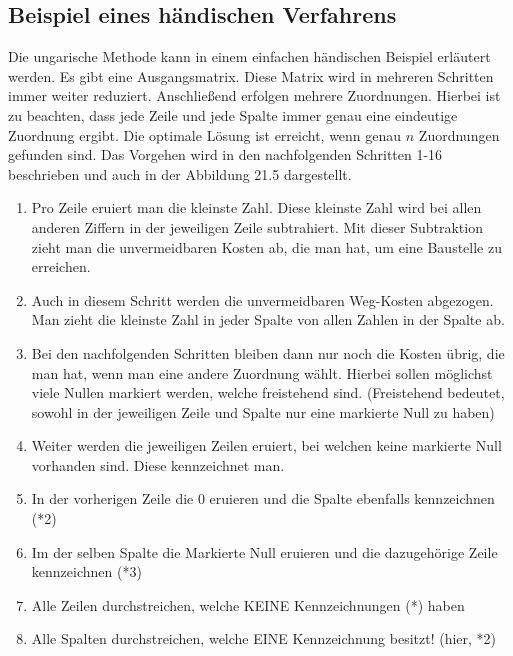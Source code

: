 \subsection{Beispiel eines händischen Verfahrens
\label{munkres:subsection:malorum}}

Die ungarische Methode kann in einem einfachen händischen Beispiel erläutert werden. Es gibt eine Ausgangsmatrix. Diese Matrix wird in mehreren Schritten immer weiter reduziert. Anschließend erfolgen mehrere Zuordnungen. Hierbei ist zu beachten, dass jede Zeile und jede Spalte immer genau eine eindeutige Zuordnung ergibt. Die optimale Lösung ist erreicht, wenn genau $n$ Zuordnungen gefunden sind. Das Vorgehen wird in den nachfolgenden Schritten 1-16 beschrieben und auch in der Abbildung 21.5 dargestellt. 

\begin{enumerate}
\item Pro Zeile eruiert man die kleinste Zahl. Diese kleinste Zahl wird bei
allen anderen Ziffern in der jeweiligen Zeile subtrahiert. Mit dieser Subtraktion zieht man die unvermeidbaren Kosten ab, die man hat, um eine Baustelle zu erreichen. 

\item Auch in diesem Schritt werden die unvermeidbaren Weg-Kosten abgezogen. Man zieht die kleinste Zahl in jeder Spalte von allen Zahlen in der Spalte ab.

\item Bei den nachfolgenden Schritten bleiben dann nur noch die Kosten übrig, die man hat, wenn man eine andere Zuordnung wählt. Hierbei sollen möglichst viele Nullen markiert werden, welche freistehend sind.
(Freistehend bedeutet, sowohl in der jeweiligen Zeile und Spalte nur
eine markierte Null zu haben)

\item Weiter werden die jeweiligen Zeilen eruiert, bei welchen keine markierte Null vorhanden sind. Diese kennzeichnet man.

\item In der vorherigen Zeile die 0 eruieren und die Spalte ebenfalls
kennzeichnen (*2)

\item Im der selben Spalte die Markierte Null eruieren und die dazugehörige
Zeile kennzeichnen (*3)

\item Alle Zeilen durchstreichen, welche KEINE Kennzeichnungen (*) haben

\item Alle Spalten durchstreichen, welche EINE Kennzeichnung besitzt! (hier, *2)


\end{enumerate}
